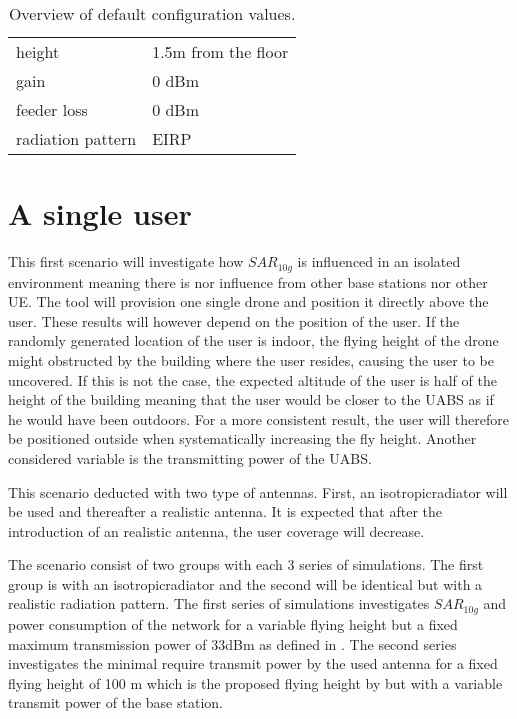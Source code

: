 \begin{table}[!htb]
\begin{tabular}[t]{ll}
        \hspace{3mm} height                     & 1.5m from the floor       \\ 
        \hspace{3mm}  gain                      & 0 dBm   \\ 
        \hspace{3mm}  feeder loss               & 0 dBm   \\ 
        \hspace{3mm}  radiation pattern         & \gls{EIRP}  \\
        \toprule
\end{tabular}
\caption{Overview of default configuration values.}
\label{table:defaultconf}
\end{table}

\section{A single user}

This first scenario will investigate how $SAR_{10g}$ is influenced in an isolated environment meaning there is nor influence 
from other base stations nor other \gls{UE}. The tool will provision one single drone and position it directly above the user.
These results will however depend on the position of the user. If the randomly generated location of the user is indoor, 
the flying height of the drone might obstructed by the building where the user resides, causing the user to be uncovered. If this is not the case,
the expected altitude of the user is half of the height of the building meaning that the user would be closer to the \gls{UABS} as 
if he would have been outdoors. For a more consistent result, the user will therefore be positioned outside when systematically 
increasing the fly height. Another considered variable is the transmitting power of the \gls{UABS}.

This scenario deducted with two type of antennas. First, an \gls{isotropicradiator} will be used and thereafter a realistic antenna.
It is expected that after the introduction of an realistic antenna, the user coverage will decrease.

The scenario consist of two groups with each 3 series of simulations. The first group is with an \gls{isotropicradiator} and the second 
will be identical but with a realistic radiation pattern. The first series of simulations
investigates $SAR_{10g}$ and power consumption of the network for a variable flying height but a fixed maximum transmission power of 
33dBm as defined in \cite{J2}. The second series 
investigates the minimal require transmit power by the used antenna for a fixed flying height of 100 m 
which is the proposed flying height by \cite{J2} but with a variable transmit power of the base station.

